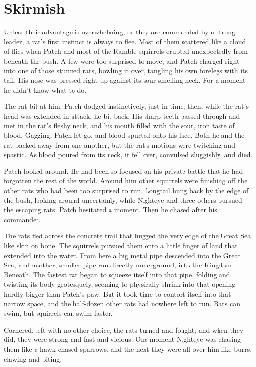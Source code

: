 \documentclass[12pt]{book}
\begin{document}
\section{Skirmish}

 Unless their advantage is overwhelming, or they are commanded by a strong leader, a rat's first instinct is always to flee. Most of them scattered like a cloud of flies when Patch and most of the Ramble squirrels erupted unexpectedly from beneath the bush. A few were too surprised to move, and Patch charged right into one of those stunned rats, bowling it over, tangling his own forelegs with its tail. His nose was pressed right up against its sour-smelling neck. For a moment he didn't know what to do.\par
 The rat bit at him. Patch dodged instinctively, just in time; then, while the rat's head was extended in attack, he bit back. His sharp teeth passed through and met in the rat's fleshy neck, and his mouth filled with the sour, iron taste of blood. Gagging, Patch let go, and blood spurted onto his face. Both he and the rat backed away from one another, but the rat's motions were twitching and spastic. As blood poured from its neck, it fell over, convulsed sluggishly, and died.\par
 Patch looked around. He had been so focused on his private battle that he had forgotten the rest of the world. Around him other squirrels were finishing off the other rats who had been too surprised to run. Longtail hung back by the edge of the bush, looking around uncertainly, while Nighteye and three others pursued the escaping rats. Patch hesitated a moment. Then he chased after his commander.\par
 The rats fled across the concrete trail that hugged the very edge of the Great Sea like skin on bone. The squirrels pursued them onto a little finger of land that extended into the water. From here a big metal pipe descended into the Great Sea, and another, smaller pipe ran directly underground, into the Kingdom Beneath. The fastest rat began to squeeze itself into that pipe, folding and twisting its body grotesquely, seeming to physically shrink into that opening hardly bigger than Patch's paw. But it took time to contort itself into that narrow space, and the half-dozen other rats had nowhere left to run. Rats can swim, but squirrels can swim faster.\par
 Cornered, left with no other choice, the rats turned and fought; and when they did, they were strong and fast and vicious. One moment Nighteye was chasing them like a hawk chased sparrows, and the next they were all over him like burrs, clawing and biting.\par
\end{document}

